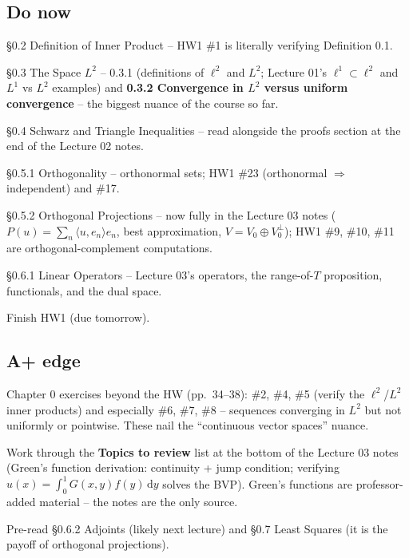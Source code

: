 \documentclass[11pt]{article}
\newcommand{\dd}{\,\mathrm{d}}
\begin{document}
\subsection*{Do now}
\begin{todo}
  \item \S0.2 Definition of Inner Product -- HW1 \#1 is literally verifying
    Definition 0.1.
  \item \S0.3 The Space $L^2$ -- 0.3.1 (definitions of $\ell^2$ and $L^2$;
    Lecture 01's $\ell^1 \subset \ell^2$ and $L^1$ vs $L^2$ examples) and
    \textbf{0.3.2 Convergence in $L^2$ versus uniform convergence} -- the
    biggest nuance of the course so far.
  \item \S0.4 Schwarz and Triangle Inequalities -- read alongside the proofs
    section at the end of the Lecture 02 notes.
  \item \S0.5.1 Orthogonality -- orthonormal sets; HW1 \#23 (orthonormal
    $\Rightarrow$ independent) and \#17.
  \item \S0.5.2 Orthogonal Projections -- now fully in the Lecture 03 notes
    ($P(u) = \sum_n \langle u, e_n\rangle e_n$, best approximation,
    $V = V_0 \oplus V_0^\perp$); HW1 \#9, \#10, \#11 are orthogonal-complement
    computations.
  \item \S0.6.1 Linear Operators -- Lecture 03's operators, the range-of-$T$
    proposition, functionals, and the dual space.
  \item Finish HW1 (due tomorrow).
\end{todo}

\subsection*{A+ edge}
\begin{todo}
  \item Chapter 0 exercises beyond the HW (pp.~34--38): \#2, \#4, \#5 (verify
    the $\ell^2$/$L^2$ inner products) and especially \#6, \#7, \#8 --
    sequences converging in $L^2$ but not uniformly or pointwise. These nail
    the ``continuous vector spaces'' nuance.
  \item Work through the \textbf{Topics to review} list at the bottom of the
    Lecture 03 notes (Green's function derivation: continuity + jump condition;
    verifying $u(x) = \int_0^1 G(x,y)f(y)\dd y$ solves the BVP). Green's
    functions are professor-added material -- the notes are the only source.
  \item Pre-read \S0.6.2 Adjoints (likely next lecture) and \S0.7 Least Squares
    (it is the payoff of orthogonal projections).
\end{todo}
\end{document}
